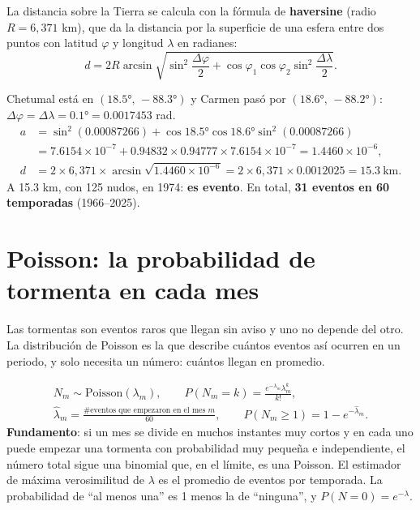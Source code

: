 La distancia sobre la Tierra se calcula con la fórmula de \textbf{haversine} (radio $R=6{,}371$ km), que da la distancia
por la superficie de una esfera entre dos puntos con latitud $\varphi$ y longitud $\lambda$ en radianes:
\[
d=2R\arcsin\sqrt{\sin^2\frac{\Delta\varphi}{2}+\cos\varphi_1\cos\varphi_2\sin^2\frac{\Delta\lambda}{2}} .
\]

\begin{amano}
Chetumal está en $(18.5°,\,-88.3°)$ y Carmen pasó por $(18.6°,\,-88.2°)$: $\Delta\varphi=\Delta\lambda=0.1°=0.0017453$ rad.
\begin{align*}
a&=\sin^2(0.00087266)+\cos18.5°\cos18.6°\sin^2(0.00087266)\\
&=7.6154\times10^{-7}+0.94832\times0.94777\times7.6154\times10^{-7}=1.4460\times10^{-6},\\
d&=2\times6{,}371\times\arcsin\sqrt{1.4460\times10^{-6}}=2\times6{,}371\times0.0012025=15.3\ \text{km}.
\end{align*}
A 15.3 km, con 125 nudos, en 1974: \textbf{es evento}. En total, \textbf{31 eventos en 60 temporadas} (1966–2025).
\end{amano}

\section{Poisson: la probabilidad de tormenta en cada mes}
\begin{intuicion}
Las tormentas son eventos raros que llegan sin aviso y uno no depende del otro. La distribución de Poisson es la que
describe cuántos eventos así ocurren en un periodo, y solo necesita un número: cuántos llegan en promedio.
\end{intuicion}

\begin{gather*}
N_m\sim\text{Poisson}(\lambda_m),\qquad P(N_m=k)=\frac{e^{-\lambda_m}\lambda_m^{k}}{k!},\\
\hat\lambda_m=\frac{\#\text{eventos que empezaron en el mes }m}{60},\qquad P(N_m\ge1)=1-e^{-\hat\lambda_m}.
\end{gather*}
\textbf{Fundamento}: si un mes se divide en muchos instantes muy cortos y en cada uno puede empezar una tormenta con
probabilidad muy pequeña e independiente, el número total sigue una binomial que, en el límite, es una Poisson. El
estimador de máxima verosimilitud de $\lambda$ es el promedio de eventos por temporada. La probabilidad de ``al menos
una'' es 1 menos la de ``ninguna'', y $P(N=0)=e^{-\lambda}$.

